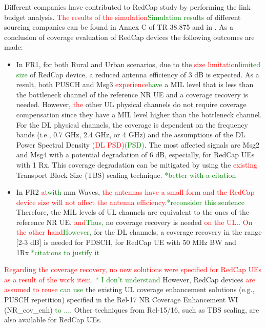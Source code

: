 \documentclass[]{IEEEtran}
\newcommand{\CAREPL}[2]{\textcolor{red}{#1}\textcolor{green}{#2}}
\begin{document}
Different companies have contributed to RedCap study by performing the link budget analysis. \CAREPL{The results of the simulation}{Simulation results} of different sourcing companies can be found in Annex C of TR 38.875 \cite{3gpp_study_2021_38.875} and in \cite{3gpp_fl_2022_R1-2009293}. As a conclusion of coverage evaluation of RedCap devices the following outcomes are made:
\begin{itemize}
    \item In FR1, for both Rural and Urban scenarios, due to the \CAREPL{size limitation}{limited size} of RedCap device\CAREPL{}{,} a reduced antenna efficiency of 3 dB is expected. 
    As a result, both PUSCH and Msg3 \CAREPL{experience}{have} a MIL level that is less than the bottleneck channel of the reference NR UE and a coverage recovery is needed. 
    However, \CAREPL{the}{} other UL physical channels do not require coverage compensation since they have a MIL level higher than the bottleneck channel. 
    For the DL physical channels, the coverage is dependent on the frequency bands (i.e., 0.7 GHz, 2.4 GHz, or 4 GHz) and the assumptions of the DL Power Spectral Density \CAREPL{(DL PSD)}{(PSD)}. The most affected signals are Msg2 and Msg4 with a potential degradation of 6 dB, especially\CAREPL{,}{} for RedCap UEs with 1 Rx. This coverage degradation can be mitigated by using the \CAREPL{existing}{}  Transport Block Size (TBS) scaling technique\CAREPL{}{. *better with a citation}
    \item In FR2 \CAREPL{at}{with} mm Waves, \CAREPL{the antennas have a small form and the RedCap device size will not affect the antenna efficiency.}{*reconsider this sentence}
    Therefore, the MIL levels of UL channels are equivalent to the ones of the reference NR UE. \CAREPL{and}{Thus,} no coverage recovery is needed\CAREPL{ on the UL.}{.} 
    \CAREPL{On the other hand}{However,} for the DL channels, a coverage recovery in the range [2-3 dB] is needed for PDSCH, for RedCap UE with 50 MHz BW and 1Rx.\CAREPL{}{*citations to justify it}
\end{itemize}


\CAREPL{Regarding the coverage recovery, no new solutions were specified for RedCap UEs as a result of the work item. }{* I don't understand} 
However, RedCap devices \CAREPL{are assumed to reuse}{ can use} the existing UL coverage enhancement solutions (e.g., PUSCH repetition)  specified in the Rel-17 NR Coverage Enhancement WI (NR\_cov\_enh) \cite{3gpp_study_nodate-3_38.830} \CAREPL{}{to ...}. 
Other techniques from Rel-15/16, such as TBS scaling, are also available for RedCap UEs.
\end{document}
